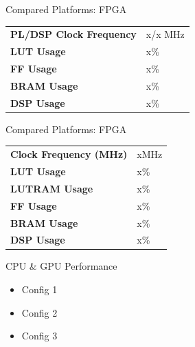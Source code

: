 \begin{frame}{Compared Platforms: FPGA}
	\begin{table}[H]
		\centering
		\begin{tabular}{ll}
			\toprule
			\textbf{PL/DSP Clock Frequency} & x/x MHz \\
			\textbf{LUT Usage}              & x\%      \\
			\textbf{FF Usage}               & x\%     \\
			\textbf{BRAM Usage}             & x\%     \\
			\textbf{DSP Usage}              & x\%     \\
			\bottomrule
		\end{tabular}
	\end{table}
\end{frame}

\begin{frame}{Compared Platforms: FPGA}
	\begin{table}[H]
		\centering
		\begin{tabular}{ll}
			\toprule
			\textbf{Clock Frequency (MHz)} & xMHz \\
			\textbf{LUT Usage}             & x\% \\
			\textbf{LUTRAM Usage}          & x\% \\
			\textbf{FF Usage}              & x\% \\
			\textbf{BRAM Usage}            & x\% \\
			\textbf{DSP Usage}             & x\%  \\
			\bottomrule
		\end{tabular}
	\end{table}
\end{frame}

\begin{frame}{CPU \& GPU Performance}
	\begin{itemize}
		\item Config 1
		\item Config 2
		\item Config 3
	\end{itemize}
\end{frame}

